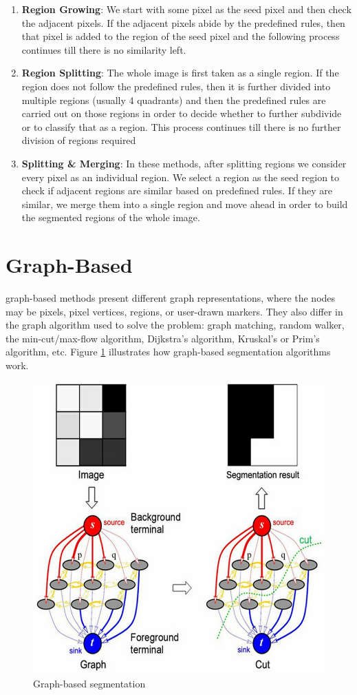 \begin{enumerate}
	\item \textbf{Region Growing}: We start with some pixel as the seed pixel and then check the adjacent pixels. If the adjacent pixels abide by the predefined rules, then that pixel is added to the region of the seed pixel and the following process continues till there is no similarity left.
	\item \textbf{Region Splitting}: The whole image is first taken as a single region. If the region does not follow the predefined rules, then it is further divided into multiple regions (usually 4 quadrants) and then the predefined rules are carried out on those regions in order to decide whether to further subdivide or to classify that as a region. This process continues till there is no further division of regions required
	\item \textbf{Splitting \& Merging}: In these methods, after splitting regions we consider every pixel as an individual region. We select a region as the seed region to check if adjacent regions are similar based on predefined rules. If they are similar, we merge them into a single region and move ahead in order to build the segmented regions of the whole image.
\end{enumerate}


\section{Graph-Based}

graph-based methods present different graph representations, where the nodes may be pixels, pixel vertices, regions, or user-drawn markers. They also differ in the graph algorithm used to solve the problem: graph matching, random walker, the min-cut/max-flow algorithm, Dijkstra's algorithm, Kruskal's or Prim's algorithm, etc. Figure \ref{fig23} illustrates how graph-based segmentation algorithms work.

\begin{figure}[htbp]
	\centering \includegraphics[width=0.65\columnwidth]{./figures/Fig23.jpg}
	\caption{Graph-based segmentation}
	\label{fig23}
\end{figure}


